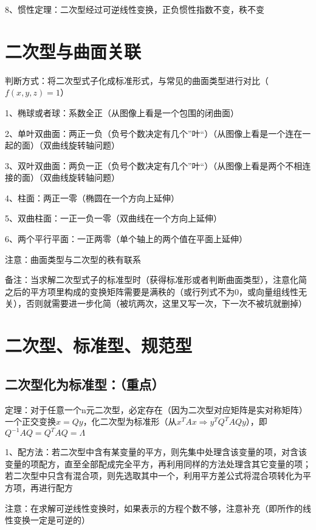 8、惯性定理：二次型经过可逆线性变换，正负惯性指数不变，秩不变

\section{二次型与曲面关联}

判断方式：将二次型式子化成标准形式，与常见的曲面类型进行对比（$ f(x,y,z)=1 $）

1、椭球或者球：系数全正（从图像上看是一个包围的闭曲面）

2、单叶双曲面：两正一负（负号个数决定有几个”叶“）（从图像上看是一个连在一起的面）（双曲线旋转轴问题）

3、双叶双曲面：两负一正（负号个数决定有几个”叶“）（从图像上看是两个不相连接的面）（双曲线旋转轴问题）

4、柱面：两正一零（椭圆在一个方向上延伸）

5、双曲柱面：一正一负一零（双曲线在一个方向上延伸）

6、两个平行平面：一正两零（单个轴上的两个值在平面上延伸）

注意：曲面类型与二次型的秩有联系

备注：当求解二次型式子的标准型时（获得标准形或者判断曲面类型），注意化简之后的平方项里构成的变换矩阵需要是满秩的（或行列式不为0，或向量组线性无关），否则就需要进一步化简（被坑两次，这里又写一次，下一次不被坑就删掉）

\section{二次型、标准型、规范型}



\subsection{二次型化为标准型：（重点）}

定理：对于任意一个n元二次型，必定存在（因为二次型对应矩阵是实对称矩阵）一个正交变换$ x=Qy $，化二次型为标准形（从$ x^TAx \Rightarrow y^TQ^TAQy $），即$ Q^{-1}AQ=Q^TAQ=\Lambda $

1、配方法：若二次型中含有某变量的平方，则先集中处理含该变量的项，对含该变量的项配方，直至全部配成完全平方，再利用同样的方法处理含其它变量的项；若二次型中只含有混合项，则先选取其中一个，利用平方差公式将混合项转化为平方项，再进行配方

注意：在求解可逆线性变换时，如果表示的方程个数不够，注意补充（即所作的线性变换一定是可逆的）

